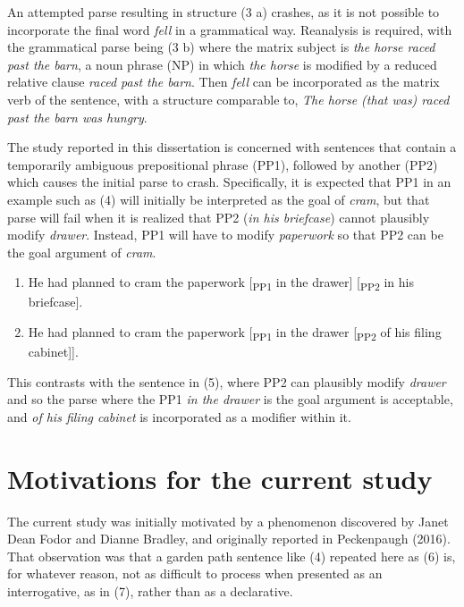 \documentclass[11pt,oneside]{book}
\begin{document}
An attempted parse resulting in structure (3 a) crashes, as it is not possible to incorporate the final word \emph{fell} in a grammatical way. Reanalysis is required, with the grammatical parse being (3 b) where the matrix subject is \emph{the horse raced past the barn}, a noun phrase (NP) in which \emph{the horse} is modified by a reduced relative clause \emph{raced past the barn}. Then \emph{fell} can be incorporated as the matrix verb of the sentence, with a structure comparable to, \emph{The horse (that was) raced past the barn was hungry}.

The study reported in this dissertation is concerned with sentences that contain a temporarily ambiguous prepositional phrase (PP1), followed by another (PP2) which causes the initial parse to crash. Specifically, it is expected that PP1 in an example such as (4) will initially be interpreted as the goal of \emph{cram}, but that parse will fail when it is realized that PP2 (\emph{in his briefcase}) cannot plausibly modify \emph{drawer}. Instead, PP1 will have to modify \emph{paperwork} so that PP2 can be the goal argument of \emph{cram}.

\begin{enumerate}
\def\labelenumi{(\arabic{enumi})}
\setcounter{enumi}{3}
\item
  He had planned to cram the paperwork {[}\textsubscript{PP1} in the drawer{]} {[}\textsubscript{PP2} in his briefcase{]}.
\item
  He had planned to cram the paperwork {[}\textsubscript{PP1} in the drawer {[}\textsubscript{PP2} of his filing cabinet{]}{]}.
\end{enumerate}

This contrasts with the sentence in (5), where PP2 can plausibly modify \emph{drawer} and so the parse where the PP1 \emph{in the drawer} is the goal argument is acceptable, and \emph{of his filing cabinet} is incorporated as a modifier within it.

\hypertarget{obs}{%
\section{Motivations for the current study}\label{obs}}

The current study was initially motivated by a phenomenon discovered by Janet Dean Fodor and Dianne Bradley, and originally reported in Peckenpaugh (2016). That observation was that a garden path sentence like (4) repeated here as (6) is, for whatever reason, not as difficult to process when presented as an interrogative, as in (7), rather than as a declarative.
\end{document}
